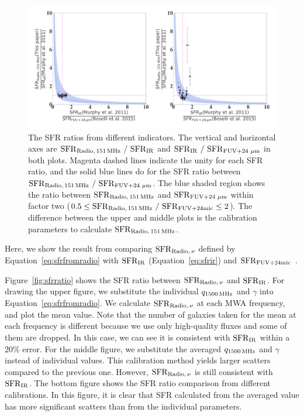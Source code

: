 \begin{figure}[htbp]
	\centering
	\includegraphics[width=\linewidth]{Chapter_5/Figures/Result_sfrratios.pdf}
    \caption[The consistency of the radio SFR with $\mr{SFR}\msb{IR}$ and $\mr{SFR}\msb{FUV+24\,\micron}$]{\label{fig:sfrratios}
        The SFR ratios from different indicators.
        The vertical and horizontal axes are $\mr{SFR}\msb{Radio,\,151\MHz}\ /\ \mr{SFR}\msb{IR}$ and $\mr{SFR}\msb{IR}\ /\ \mr{SFR}\msb{FUV+24\,\micron}$ in both plots.
        Magenta dashed lines indicate the unity for each SFR ratio, and the solid blue lines do for the SFR ratio between $\mr{SFR}\msb{Radio,\,151\MHz}\ /\ \mr{SFR}\msb{FUV+24\,\micron}$.
        The blue shaded region shows the ratio between $\mathrm{SFR}_{\mathrm{Radio},\,151\,\mathrm{MHz}}$ and $\mr{SFR}\msb{FUV+24\,\micron}$ within factor two ($0.5 \leq \mathrm{SFR}_{\mathrm{Radio},\,151\,\mathrm{MHz}}\ /\ \mathrm{SFR}_{\mathrm{FUV+24mic}} \leq 2$).
        The difference between the upper and middle plots is the calibration parameters to calculate $\mathrm{SFR}_{\mathrm{Radio},\,151\,\mathrm{MHz}}$.
    }
\end{figure}

Here, we show the result from comparing $\mathrm{SFR}_{\mathrm{Radio},\,\nu}$ defined by Equation~\ref{eq:sfrfromradio} with $\mr{SFR}\msb{IR}$ (Equation~\ref{eq:sfrir}) and $\mathrm{SFR}_{\mathrm{FUV+24mic}}$ \citep{Boselli2015}.

Figure~\ref{fig:sfrratio} shows the SFR ratio between $\mathrm{SFR}_{\mathrm{Radio},\,\nu}$ and $\mr{SFR}\msb{IR}$.
For drawing the upper figure, we substitute the individual $q_{1500\,\mathrm{MHz}}$ and $\gamma$ into Equation~\ref{eq:sfrfromradio}.
We calculate $\mathrm{SFR}_{\mathrm{Radio},\,\nu}$ at each MWA frequency, and plot the mean value.
Note that the number of galaxies taken for the mean at each frequency is different because we use only high-quality fluxes and some of them are dropped.
In this case, we can see it is consistent with $\mr{SFR}\msb{IR}$ within a 20\% error.
For the middle figure, we substitute the averaged $q_{1500\,\mathrm{MHz}}$ and $\gamma$ instead of individual values.
This calibration method yields larger scatters compared to the previous one.
However, $\mathrm{SFR}_{\mathrm{Radio},\,\nu}$ is still consistent with $\mr{SFR}\msb{IR}$.
The bottom figure shows the SFR ratio comparison from different calibrations.
In this figure, it is clear that SFR calculated from the averaged value has more significant scatters than from the individual parameters.

